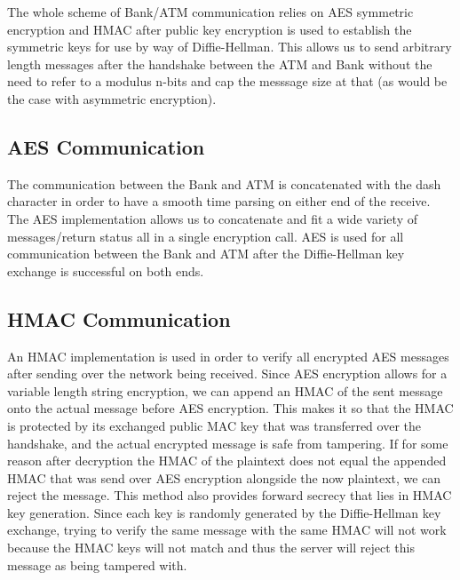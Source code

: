 \documentclass{article}
\begin{document}
	\medskip
	The whole scheme of Bank/ATM communication relies on AES symmetric encryption and HMAC after public key encryption is used to  establish the symmetric keys for use by way of Diffie-Hellman. This allows us to send arbitrary length messages after the handshake between the ATM and Bank without the need to refer to a modulus n-bits and cap the messsage size at that (as would be the case with asymmetric encryption).
	
	\subsection{AES Communication}\label{sec:aescoms}
		The communication between the Bank and ATM is concatenated with the dash character in order to have a smooth time parsing on either end of the receive. The AES implementation allows us to concatenate and fit a wide variety of messages/return status all in a single encryption call. AES is used for all communication between the Bank and ATM after the Diffie-Hellman key exchange is successful on both ends.
	
	\subsection{HMAC Communication}\label{sec:hmaccoms}
		An HMAC implementation is used in order to verify all encrypted AES messages after sending over the network being received. Since AES encryption allows for a variable length string encryption, we can append an HMAC of the sent message onto the actual message before AES encryption. This makes it so that the HMAC is protected by its exchanged public MAC key that was transferred over the handshake, and the actual encrypted message is safe from tampering. If for some reason after decryption the HMAC of the plaintext does not equal the appended HMAC that was send over AES encryption alongside the now plaintext, we can reject the message. This method also provides forward secrecy that lies in HMAC key generation. Since each key is randomly generated by the Diffie-Hellman key exchange, trying to verify the same message with the same HMAC will not work because the HMAC keys will not match and thus the server will reject this message as being tampered with.
		
	
\end{document}
